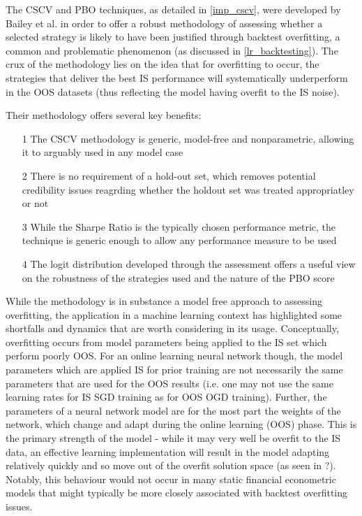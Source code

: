 \documentclass[a4paper,11pt,oneside]{article}
\theoremstyle{plain}
\theoremstyle{definition}
\begin{document}
The CSCV and PBO techniques, as detailed in \ref{imp_cscv}, were developed by Bailey et al. \cite{BailyPBO} in order to offer a robust methodology of assessing whether a selected strategy is likely to have been justified through backtest overfitting, a common and problematic phenomenon (as discussed in \ref{lr_backtesting}). The crux of the methodology lies on the idea that for overfitting to occur, the strategies that deliver the best IS performance will systematically underperform in the OOS datasets (thus reflecting the model having overfit to the IS noise).\newline

Their methodology offers several key benefits:
\begin{itemize}
	\item[1] The CSCV methodology is generic, model-free and nonparametric, allowing it to arguably used in any model case
	\item[2] There is no requirement of a hold-out set, which removes potential credibility issues reagrding whether the holdout set was treated appropriatley or not
	\item[3] While the Sharpe Ratio is the typically chosen performance metric, the technique is generic enough to allow any performance measure to be used
	\item[4] The logit distribution developed through the assessment offers a useful view on the robustness of the strategies used and the nature of the PBO score
\end{itemize}

\texttt{}\newline
While the methodology is in substance a model free approach to assessing overfitting, the application in a machine learning context has highlighted some shortfalls and dynamics that are worth considering in its usage. Conceptually, overfitting occurs from model parameters being applied to the IS set which perform poorly OOS. For an online learning neural network though, the model parameters which are applied IS for prior training are not necessarily the same parameters that are used for the OOS results (i.e. one may not use the same learning rates for IS SGD training as for OOS OGD training). Further, the parameters of a neural network model are for the most part the weights of the network, which change and adapt during the online learning (OOS) phase. This is the primary strength of the model - while it may very well be overfit to the IS data, an effective learning implementation will result in the model adapting relatively quickly and so move out of the overfit solution space (as seen in ?). Notably, this behaviour would not occur in many static financial econometric models that might typically be more closely associated with backtest overfitting issues.
\end{document}
